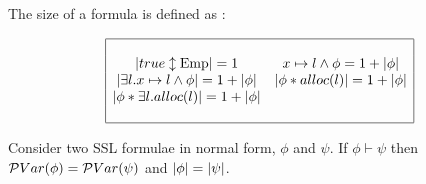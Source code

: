 
\begin{definition}
The size of a formula is defined as :


$$
\begin{array}{|cc|}
\hline
&\\
\sizef{\Formula{\true}{\Emp}}=1 & \Andpure{\Pointsto{x}{l}}{\phi}=1+\sizef{\phi}\\
\sizef{\exists l. \Andpure{\Pointsto{x}{l}}{\phi}} = 1+\sizef{\phi}& \sizef{\Sep{\phi}{\Alloc{l}} } = 1+\sizef{\phi} \\
\sizef{\Sep{\phi}{ \exists l. \Alloc{l}} } = 1+\sizef{\phi} & \\
&\\
\hline
\end{array}
$$
\end{definition}

\begin{lemma}
\label{lemma:entailsize}
Consider two SSL formulae in normal form, $\phi$ and $\psi$. If $\phi \vdash \psi$ then
$\mathcal{P}Var(\phi)=\mathcal{P}Var(\psi)$ and $|{\phi}|=|{\psi}|$.
\end{lemma}

